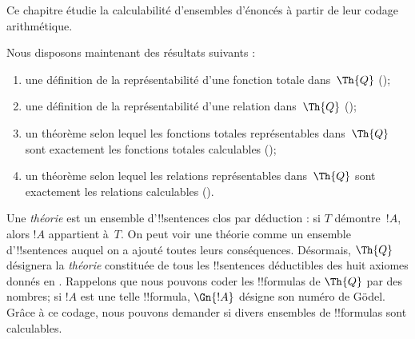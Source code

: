 \documentclass[../../../include/open-logic-section]{subfiles}
\begin{document}


Ce chapitre étudie la calculabilité d'ensembles d'énoncés
à partir de leur codage arithmétique.

Nous disposons maintenant des résultats suivants :
\begin{enumerate}
\item une définition de la représentabilité d'une fonction totale
  dans~$\Th{Q}$
  ();
\item une définition de la représentabilité d'une relation
  dans~$\Th{Q}$
  ();
\item un théorème selon lequel les fonctions totales représentables
  dans~$\Th{Q}$ sont exactement les fonctions totales calculables
  ();
\item un théorème selon lequel les relations représentables
  dans~$\Th{Q}$ sont exactement les relations calculables
  ().
\end{enumerate}

Une {\em théorie} est un ensemble d'!!{sentence}s clos par
déduction : si $T$ démontre~$!A$, alors $!A$ appartient à~$T$.
On peut voir une théorie comme un ensemble d'!!{sentence}s
auquel on a ajouté toutes leurs conséquences.
Désormais, $\Th{Q}$ désignera la {\em théorie} constituée
de tous les !!{sentence}s déductibles des huit axiomes
donnés en .
Rappelons que nous pouvons coder les !!{formula}s de
$\Th{Q}$ par des nombres; si $!A$ est une telle
!!{formula}, $\Gn{!A}$ désigne son numéro de Gödel.
Grâce à ce codage, nous pouvons demander si divers
ensembles de !!{formula}s sont calculables.
\end{document}
